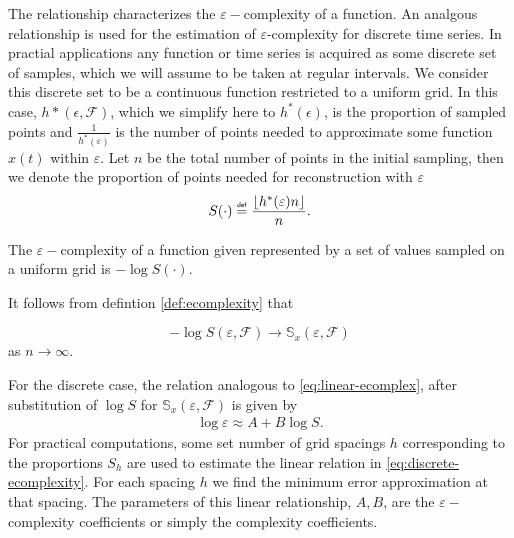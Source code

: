   The relationship characterizes the 
  $\varepsilon-$complexity of a function. An analgous 
  relationship is used 
  for the estimation of $\varepsilon$-complexity for 
  discrete time series.
  In practial applications any function or time series 
  is acquired as some discrete set of samples, which we
  will assume to be taken at regular intervals. We 
  consider this discrete set to be a continuous function
  restricted to a uniform grid. In this case, 
  $h*(\epsilon, \mathcal{F})$, which we simplify here to 
  $h^*(\epsilon)$, is the proportion of sampled points
  and $\frac{1}{h^*(\varepsilon)}$ is the 
  number of points needed to approximate some function $x(t)$ within 
  $\varepsilon$. Let $n$ be the total number of points 
  in the initial sampling, then we denote the 
  proportion of points needed for reconstruction with 
  $\varepsilon$ 
  \begin{align}
     S(\cdot) \defeq \frac{\left\lfloor h^*(\varepsilon)n 
     \right\rfloor }{n}.
   \end{align} 
   \begin{defn}
     The $\varepsilon-$complexity of a function 
     given represented by a set of values sampled on 
     a uniform grid is $-\log S(\cdot)$.
   \end{defn}
  It follows from defintion \ref{def:ecomplexity} that
  \begin{prop}
    \[
      -\log S(\varepsilon, \mathcal{F}) \to \mathbb{S}_x(\varepsilon, \mathcal{F}) 
    \]
    as $n \to \infty$.
  \end{prop}
  For the discrete case, the relation analogous to \ref{eq:linear-ecomplex}, after substitution of $\log S$ for $\mathbb{S}_x(\varepsilon, \mathcal{F})$ is given by
  \begin{align}\label{eq:discrete-ecomplexity}
     \log \varepsilon  \approx A + B \log S.
   \end{align} 
  For practical computations, some set number of grid spacings 
  $h$ corresponding to the proportions $S_h$ are used to 
  estimate the linear relation in \ref{eq:discrete-ecomplexity}. 
  For each spacing $h$ we find the minimum error approximation 
  at that spacing.
  The parameters of this linear relationship, $A, B$, are the 
  $\varepsilon-$complexity coefficients or simply the complexity coefficients. 

  


